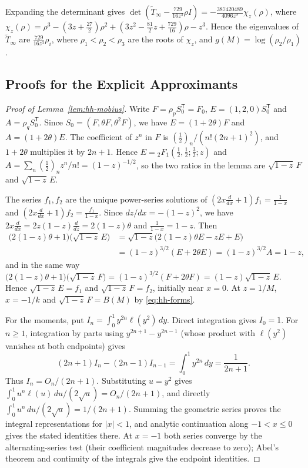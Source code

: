 \documentclass[oneside,english,11pt]{amsart}
\begin{document}
Expanding the determinant gives $\det(\tilde T_\infty-\frac{729}{16z^3}\rho I)=-\frac{387420489}{4096z^9}\chi_z(\rho)$, where $\chi_z(\rho)=\rho^3-(3z+\frac{27}2)\rho^2+(3z^2-\frac{81}2z+\frac{729}{16})\rho-z^3$. Hence the eigenvalues of $\tilde T_\infty$ are $\frac{729}{16z^3}\rho_i$, where $\rho_1<\rho_2<\rho_3$ are the roots of $\chi_z$, and $g(M)=\log(\rho_2/\rho_1)$.

\subsection{Proofs for the Explicit Approximants}\label{app:hh-approx}

\begin{proof}[Proof of Lemma~\ref{lem:hh-mobius}]
Write $F=\rho_pS_0^{\mathsf T}=F_0$, $E=(1,2,0)S_0^{\mathsf T}$ and $A=\rho_qS_0^{\mathsf T}$. Since $S_0=(F,\theta F,\theta^2F)$, we have $E=(1+2\theta)F$ and $A=(1+2\theta)E$.
The coefficient of $z^n$ in $F$ is $(\frac12)_n/(n!(2n+1)^2)$, and $1+2\theta$ multiplies it by $2n+1$. Hence
$E={}_2F_1(\frac12,\frac12;\frac32;z)$ and $A=\sum_n(\frac12)_nz^n/n!=(1-z)^{-1/2}$, so the two ratios in the lemma are $\sqrt{1-z}\,F$ and $\sqrt{1-z}\,E$.

The series $f_1,f_2$ are the unique power-series solutions of $(2x\frac d{dx}+1)f_1=\frac1{1-x}$ and
$(2x\frac d{dx}+1)f_2=\frac{f_1}{1-x}$. Since $dz/dx=-(1-z)^2$, we have $2x\frac d{dx}=2z(1-z)\frac d{dz}=2(1-z)\theta$ and $\frac1{1-x}=1-z$. Then
\begin{align*}
 \bigl(2(1-z)\theta+1\bigr)\bigl(\sqrt{1-z}\,E\bigr)&=\sqrt{1-z}\bigl(2(1-z)\theta E-zE+E\bigr)\\
 &=(1-z)^{3/2}(E+2\theta E)=(1-z)^{3/2}A=1-z,
\end{align*}
and in the same way $\bigl(2(1-z)\theta+1\bigr)\bigl(\sqrt{1-z}\,F\bigr)=(1-z)^{3/2}(F+2\theta F)=(1-z)\sqrt{1-z}\,E$.
Hence $\sqrt{1-z}\,E=f_1$ and $\sqrt{1-z}\,F=f_2$, initially near $x=0$. At $z=1/M$, $x=-1/k$ and $\sqrt{1-z}\,F=B(M)$ by \eqref{eq:hh-forms}.

For the moments, put $I_n=\int_0^1y^{2n}\ell(y^2)\,dy$. Direct integration gives $I_0=1$.
For $n\ge1$, integration by parts using $y^{2n+1}-y^{2n-1}$ (whose product with $\ell(y^2)$ vanishes at both endpoints) gives
\[
 (2n+1)I_n-(2n-1)I_{n-1}=\int_0^1y^{2n}\,dy=\frac1{2n+1}.
\]
Thus $I_n=O_n/(2n+1)$. Substituting $u=y^2$ gives $\int_0^1u^n\ell(u)\,du/(2\sqrt u)=O_n/(2n+1)$, and directly $\int_0^1u^n\,du/(2\sqrt u)=1/(2n+1)$.
Summing the geometric series proves the integral representations for $|x|<1$, and analytic continuation along $-1<x\le0$ gives the stated identities there.
At $x=-1$ both series converge by the alternating-series test (their coefficient magnitudes decrease to zero); Abel's theorem and continuity of the integrals give the endpoint identities.
\end{proof}
\end{document}
